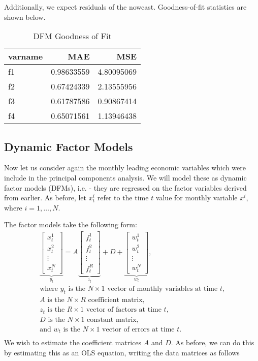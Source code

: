 \documentclass[11pt, letterpaper]{article}\usepackage[]{graphicx}\usepackage[]{color}
\begin{document}
Additionally, we expect residuals of the nowcast. Goodness-of-fit statistics are shown below.
\begin{table}[H]
\centering
\begingroup\footnotesize
\begin{tabular}{lrr}
  \hline
varname & MAE & MSE \\ 
  \hline
f1 & 0.98633559 & 4.80095069 \\ 
  f2 & 0.67424339 & 2.13555956 \\ 
  f3 & 0.61787586 & 0.90867414 \\ 
  f4 & 0.65071561 & 1.13946438 \\ 
   \hline
\end{tabular}
\endgroup
\caption{DFM Goodness of Fit} 
\end{table}




\subsection{Dynamic Factor Models}
Now let us consider again the monthly leading economic variables which were include in the principal components analysis. We will model these as dynamic factor models (DFMs), i.e. - they are regressed on the factor variables derived from earlier. As before, let $x^i_t$ refer to the time $t$ value for monthly variable $x^i$, where $i = 1, \dots, N$.

The factor models take the following form:
\begin{align*}
\underbrace{\begin{bmatrix}
	x^1_t\\
	x^2_t\\
	\vdots \\
	x^N_t
\end{bmatrix}}_{y_t}
=
A
\underbrace{\begin{bmatrix}
	f^1_{t}\\
	f^2_{t}\\
	\vdots \\
	f^R_{t}
\end{bmatrix}}_{z_t}
+
D 
+
\underbrace{\begin{bmatrix}
	w^1_t\\
	w^2_t\\
	\vdots\\
	w^N_t
\end{bmatrix}}_{w_t},\\
\text{where $y_t$ is the $N \times 1$ vector of monthly variables at time $t$,}\\
\text{$A$ is the $N \times R$ coefficient matrix,}\\
\text{$z_t$ is the $R \times 1$ vector of factors at time $t$,}\\
\text{$D$ is the $N \times 1$ constant matrix,}\\
\text{and $w_t$ is the $N \times 1$ vector of errors at time $t$.}\\
\end{align*}
We wish to estimate the coefficient matrices $A$ and $D$. As before, we can do this by estimating this as an OLS equation, writing the data matrices as follows
\end{document}
